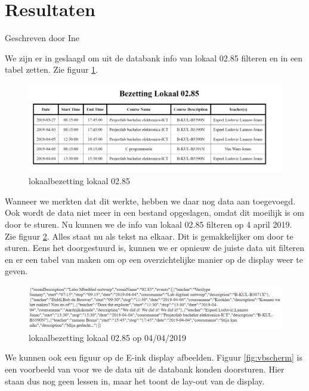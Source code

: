 \documentclass[a4paper,kul]{kulakarticle} %
\begin{document}
\newpage

\section{Resultaten}
{\scriptsize Geschreven door Ine}
\newline

We zijn er in geslaagd om uit de databank info van lokaal 02.85 filteren en in een tabel zetten. Zie figuur \ref{fig:vboutput}.
\newline

\begin{figure}[h]
	\centering
	\includegraphics[width=1\textwidth]{vbDatabank}
	\caption{lokaalbezetting lokaal 02.85}
	\label{fig:vboutput}
\end{figure}

Wanneer we merkten dat dit werkte, hebben we daar nog data aan toegevoegd. Ook wordt de data niet meer in een bestand opgeslagen, omdat dit moeilijk is om door te sturen. Nu kunnen we de info van lokaal 02.85 filteren op 4 april 2019. Zie figuur \ref{fig:vbdata}. Alles staat nu als tekst na elkaar. Dit is gemakkelijker om door te sturen. Eens het doorgestuurd is, kunnen we er opnieuw de juiste data uit filteren en er een tabel van maken om op een overzichtelijke manier op de display weer te geven.
\newline

\begin{figure}[h]
	\centering
	\includegraphics[width=1\textwidth]{vbData02_85}
	\caption{lokaalbezetting lokaal 02.85 op 04/04/2019}
	\label{fig:vbdata}
\end{figure}

We kunnen ook een figuur op de E-ink display afbeelden. Figuur \ref{fig:vbscherm} is een voorbeeld van voor we de data uit de databank konden doorsturen. Hier staan dus nog geen lessen in, maar het toont de lay-out van de display.
\newline
\newline
\end{document}
